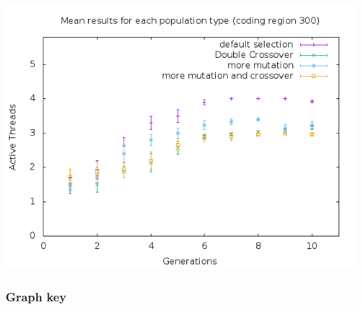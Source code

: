 \documentclass[11pt]{article}
\begin{document}
\begin{itemize}
\includegraphics[width=.9\linewidth]{population-comparison-300.png}
\end{itemize}


\subsubsection*{Graph key}
\label{sec:orgheadline31}
\end{document}
